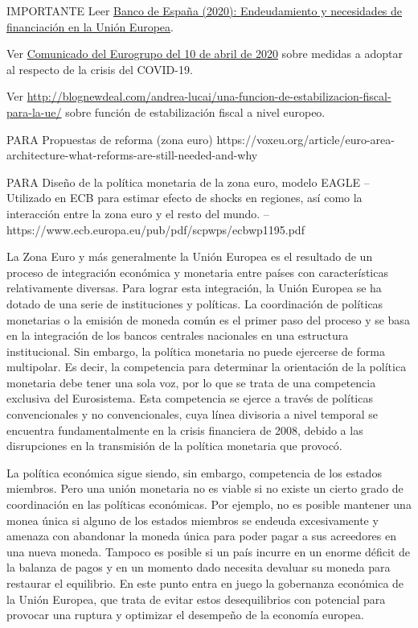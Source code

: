 \documentclass{nuevotema}
\begin{document}
\ideaclave

IMPORTANTE Leer \href{https://www.bde.es/f/webbde/SES/Secciones/Publicaciones/PublicacionesSeriadas/DocumentosOcasionales/20/Fich/do2021.pdf}{Banco de España (2020): Endeudamiento y necesidades de financiación en la Unión Europea}.

Ver \href{https://www.consilium.europa.eu/en/press/press-releases/2020/04/09/report-on-the-comprehensive-economic-policy-response-to-the-covid-19-pandemic/}{Comunicado del Eurogrupo del 10 de abril de 2020} sobre medidas a adoptar al respecto de la crisis del COVID-19.

Ver \url{http://blognewdeal.com/andrea-lucai/una-funcion-de-estabilizacion-fiscal-para-la-ue/} sobre función de estabilización fiscal a nivel europeo. 

PARA Propuestas de reforma (zona euro)
https://voxeu.org/article/euro-area-architecture-what-reforms-are-still-needed-and-why

PARA Diseño de la política monetaria de la zona euro, modelo EAGLE -- Utilizado en ECB para estimar efecto de shocks en regiones, así como la interacción entre la zona euro y el resto del mundo. -- https://www.ecb.europa.eu/pub/pdf/scpwps/ecbwp1195.pdf

La Zona Euro y más generalmente la Unión Europea es el resultado de un proceso de integración económica y monetaria entre países con características relativamente diversas. Para lograr esta integración, la Unión Europea se ha dotado de una serie de instituciones y políticas. La coordinación de políticas monetarias o la emisión de moneda común es el primer paso del proceso y se basa en la integración de los bancos centrales nacionales en una estructura institucional. Sin embargo, la política monetaria no puede ejercerse de forma multipolar. Es decir, la competencia para determinar la orientación de la política monetaria debe tener una sola voz, por lo que se trata de una competencia exclusiva del Eurosistema. Esta competencia se ejerce a través de políticas convencionales y no convencionales, cuya línea divisoria a nivel temporal se encuentra fundamentalmente en la crisis financiera de 2008, debido a las disrupciones en la transmisión de la política monetaria que provocó.

La política económica sigue siendo, sin embargo, competencia de los estados miembros. Pero una unión monetaria no es viable si no existe un cierto grado de coordinación en las políticas económicas. Por ejemplo, no es posible mantener una monea única si alguno de los estados miembros se endeuda excesivamente y amenaza con abandonar la moneda única para poder pagar a sus acreedores en una nueva moneda. Tampoco es posible si un país incurre en un enorme déficit de la balanza de pagos y en un momento dado necesita devaluar su moneda para restaurar el equilibrio. En este punto entra en juego la gobernanza económica de la Unión Europea, que trata de evitar estos desequilibrios con potencial para provocar una ruptura y optimizar el desempeño de la economía europea.
\end{document}
